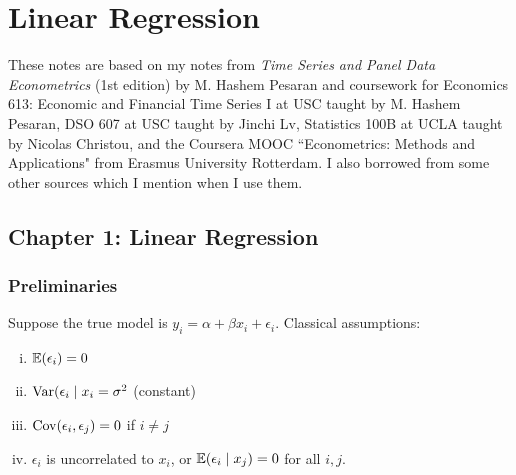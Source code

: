 %
%
%
%
%
%
%
%
%
%
%
%
%
%

\section{Linear Regression}

These notes are based on my notes from \textit{Time Series and Panel Data Econometrics} (1st edition) by M. Hashem Pesaran and coursework for Economics 613: Economic and Financial Time Series I at USC taught by M. Hashem Pesaran, DSO 607 at USC taught by Jinchi Lv, Statistics 100B at UCLA taught by Nicolas Christou, and the Coursera MOOC ``Econometrics: Methods and Applications" from Erasmus University Rotterdam. I also borrowed from some other sources which I mention when I use them.



\subsection{Chapter 1: Linear Regression}

\subsubsection{Preliminaries}

Suppose the true model is \(y_i = \alpha + \beta x_i + \epsilon_i\). Classical assumptions:

\begin{enumerate}[(i)]

\item \(\E(\epsilon_i)= 0\)

\item \(\Var(\epsilon_i \mid x_i = \sigma^2\) (constant)

\item \(\Cov(\epsilon_i, \epsilon_j) = 0 \) if \(i \neq j\)

\item \(\epsilon_i\) is uncorrelated to \(x_i\), or \(\E(\epsilon_i \mid x_j) = 0 \) for all \(i, j\).

\end{enumerate}

